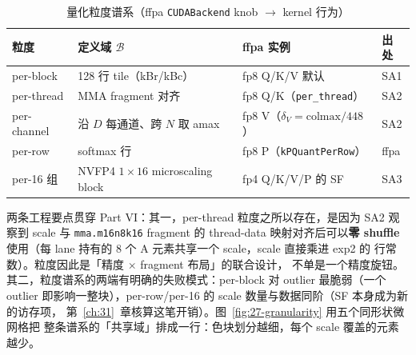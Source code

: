\begin{table}[htbp]
  \centering
  \caption{量化粒度谱系（ffpa \texttt{CUDABackend} knob $\to$ kernel 行为）}
  \label{tab:27-granularity}
  \begin{tabular}{llll}
    \toprule
    粒度 & 定义域 $\mathcal{B}$ & ffpa 实例 & 出处 \\
    \midrule
    per-block & 128 行 tile（kBr/kBc） & fp8 Q/K/V 默认 & SA1 \\
    per-thread & MMA fragment 对齐 & fp8 Q/K（\texttt{per\_thread}） & SA2 \\
    per-channel & 沿 $D$ 每通道、跨 $N$ 取 amax & fp8 V（$\delta_V = \mathrm{colmax}/448$） & SA2 \\
    per-row & softmax 行 & fp8 P（\texttt{kPQuantPerRow}） & ffpa \\
    per-16 组 & NVFP4 $1\times16$ microscaling block & fp4 Q/K/V/P 的 SF & SA3 \\
    \bottomrule
  \end{tabular}
\end{table}

两条工程要点贯穿 Part VI：其一，per-thread 粒度之所以存在，是因为 SA2 观察到
scale 与 \texttt{mma.m16n8k16} fragment 的 thread-data 映射对齐后可以\textbf{零
shuffle} 使用（每 lane 持有的 8 个 A 元素共享一个 scale，scale 直接乘进 exp2 的
行常数）。粒度因此是「精度 $\times$ fragment 布局」的联合设计，
不单是一个精度旋钮。其二，粒度谱系的两端有明确的失败模式：per-block 对 outlier 最脆弱（一个 outlier
即影响一整块），per-row/per-16 的 scale 数量与数据同阶（SF 本身成为新的访存项，
第~\ref{ch:31}~章核算这笔开销）。图~\ref{fig:27-granularity} 用五个同形状微网格把
整条谱系的「共享域」排成一行：色块划分越细，每个 scale 覆盖的元素越少。

